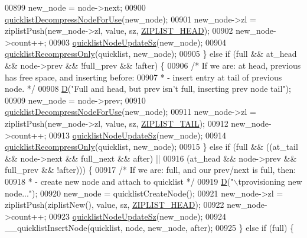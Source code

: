 \begin{DoxyCode}
{{{{{00899         new\_node = node->next;
00900         \hyperlink{quicklist_8c_a2f30e6f482d51059f06fa34df69734e1}{quicklistDecompressNodeForUse}(new\_node);
00901         new\_node->zl = ziplistPush(new\_node->zl, value, sz, \hyperlink{ziplist_8h_a88d32e547c509220e1c50cd9306186ba}{ZIPLIST\_HEAD});
00902         new\_node->count++;
00903         \hyperlink{quicklist_8c_a03a3947a9423d234923343702619c553}{quicklistNodeUpdateSz}(new\_node);
00904         \hyperlink{quicklist_8c_a75672a682e90fe973934910f3ee866a3}{quicklistRecompressOnly}(quicklist, new\_node);
00905     \} \textcolor{keywordflow}{else} \textcolor{keywordflow}{if} (full && at\_head && node->prev && !full\_prev && !after) \{
00906         \textcolor{comment}{/* If we are: at head, previous has free space, and inserting before:}
00907 \textcolor{comment}{         *   - insert entry at tail of previous node. */}
00908         \hyperlink{debugmacro_8h_a74021f021dcdfbb22891787b79c5529d}{D}(\textcolor{stringliteral}{"Full and head, but prev isn't full, inserting prev node tail"});
00909         new\_node = node->prev;
00910         \hyperlink{quicklist_8c_a2f30e6f482d51059f06fa34df69734e1}{quicklistDecompressNodeForUse}(new\_node);
00911         new\_node->zl = ziplistPush(new\_node->zl, value, sz, \hyperlink{ziplist_8h_a25d058a2c2c0db0f131f84d23ede6ba2}{ZIPLIST\_TAIL});
00912         new\_node->count++;
00913         \hyperlink{quicklist_8c_a03a3947a9423d234923343702619c553}{quicklistNodeUpdateSz}(new\_node);
00914         \hyperlink{quicklist_8c_a75672a682e90fe973934910f3ee866a3}{quicklistRecompressOnly}(quicklist, new\_node);
00915     \} \textcolor{keywordflow}{else} \textcolor{keywordflow}{if} (full && ((at\_tail && node->next && full\_next && after) ||
00916                         (at\_head && node->prev && full\_prev && !after))) \{
00917         \textcolor{comment}{/* If we are: full, and our prev/next is full, then:}
00918 \textcolor{comment}{         *   - create new node and attach to quicklist */}
00919         \hyperlink{debugmacro_8h_a74021f021dcdfbb22891787b79c5529d}{D}(\textcolor{stringliteral}{"\(\backslash\)tprovisioning new node..."});
00920         new\_node = quicklistCreateNode();
00921         new\_node->zl = ziplistPush(ziplistNew(), value, sz, \hyperlink{ziplist_8h_a88d32e547c509220e1c50cd9306186ba}{ZIPLIST\_HEAD});
00922         new\_node->count++;
00923         \hyperlink{quicklist_8c_a03a3947a9423d234923343702619c553}{quicklistNodeUpdateSz}(new\_node);
00924         \_\_quicklistInsertNode(quicklist, node, new\_node, after);
00925     \} \textcolor{keywordflow}{else} \textcolor{keywordflow}{if} (full) \{
}}}}}
\end{DoxyCode}
